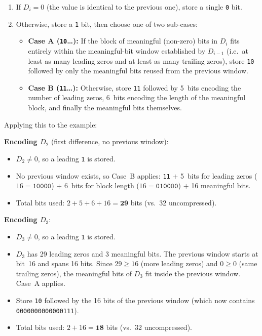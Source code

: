 \begin{enumerate}
  \item If $D_i = 0$ (the value is identical to the previous one), store a single
        \texttt{0} bit.
  \item Otherwise, store a \texttt{1} bit, then choose one of two sub-cases:
        \begin{itemize}
          \item \textbf{Case A (\texttt{10}\ldots):} If the block of meaningful (non-zero) bits in $D_i$ fits entirely within the meaningful-bit window established by $D_{i-1}$ (i.e.\ at least as many leading zeros and at least as many trailing zeros), store \texttt{10} followed by only the meaningful bits reused from the previous window.
          \item \textbf{Case B (\texttt{11}\ldots):} Otherwise, store \texttt{11} followed by 5~bits encoding the number of leading zeros, 6~bits encoding the length of the meaningful block, and finally the meaningful bits themselves.
        \end{itemize}
\end{enumerate}

Applying this to the example:

\textbf{Encoding $D_2$} (first difference, no previous window):
\begin{itemize}
  \item $D_2 \neq 0$, so a leading \texttt{1} is stored.
  \item No previous window exists, so Case~B applies: \texttt{11} $+$ 5~bits for
        leading zeros ($16 = \texttt{10000}$) $+$ 6~bits for block length ($16 =
          \texttt{010000}$) $+$ 16 meaningful bits.
  \item Total bits used: $2 + 5 + 6 + 16 = \mathbf{29}$ bits (vs.\ 32 uncompressed).
\end{itemize}

\textbf{Encoding $D_3$}:
\begin{itemize}
  \item $D_3 \neq 0$, so a leading \texttt{1} is stored.
  \item $D_3$ has 29 leading zeros and 3 meaningful bits. The previous window starts at bit~16 and spans 16 bits. Since $29 \geq 16$ (more leading zeros) and $0 \geq 0$ (same trailing zeros), the meaningful bits of $D_3$ fit inside the previous window. Case~A applies.
  \item Store \texttt{10} followed by the 16 bits of the previous window (which now
        contains \\\texttt{0000000000000111}).
  \item Total bits used: $2 + 16 = \mathbf{18}$ bits (vs.\ 32 uncompressed).
\end{itemize}

